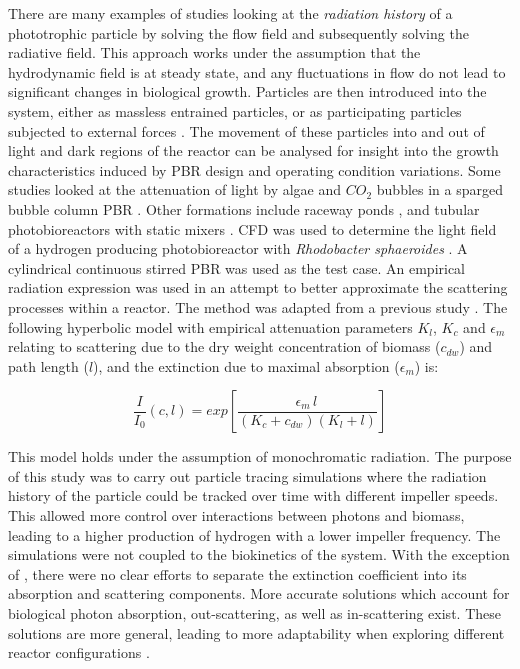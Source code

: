 \skippingparagraph
There are many examples of studies looking at the \textit{radiation history} of a phototrophic particle by solving the flow field and subsequently solving the radiative field. This approach works under the assumption that the hydrodynamic field is at steady state, and any fluctuations in flow do not lead to significant changes in biological growth. Particles are then introduced into the system, either as massless entrained particles, or as participating particles subjected to external forces \cite{zhang2013}. The movement of these particles into and out of light and dark regions of the reactor can be analysed for insight into the growth characteristics induced by PBR design and operating condition variations. Some studies looked at the attenuation of light by algae and $CO_2$ bubbles in a sparged bubble column PBR \cite{hochhalter2014}. Other formations include raceway ponds \cite{gharagozloo2014,Park2015}, and tubular photobioreactors with static mixers \cite{cheng2016}. CFD was used to determine the light field of a hydrogen producing photobioreactor with \textit{Rhodobacter sphaeroides} \cite{krujatz2015}. A cylindrical continuous stirred PBR was used as the test case. An empirical radiation expression was used in an attempt to better approximate the scattering processes within a reactor. The method was adapted from a previous study \cite{suh2003}. The following hyperbolic model with empirical attenuation parameters $K_l$, $K_c$ and $\epsilon_m$ relating to scattering due to the dry weight concentration of biomass ($c_{dw}$) and path length ($l$), and the extinction due to maximal absorption ($\epsilon_m$) is:


\begin{equation} 
\frac{I}{I_0} (c,l) = exp \left[\frac{\epsilon_m \, l \, }{(K_c + c_{dw})(K_l + l)}\right]
\end{equation}

This model holds under the assumption of monochromatic radiation. The purpose of this study was to carry out particle tracing simulations where the radiation history of the particle could be tracked over time with different impeller speeds. This allowed more control over interactions between photons and biomass, leading to a higher production of hydrogen with a lower impeller frequency. The simulations were not coupled to the biokinetics of the system. With the exception of \cite{gharagozloo2014,krujatz2015}, there were no clear efforts to separate the extinction coefficient into its absorption and scattering components. More accurate solutions which account for biological photon absorption, out-scattering, as well as in-scattering exist. These solutions are more general, leading to more adaptability when exploring different reactor configurations \cite{ho2009}.


